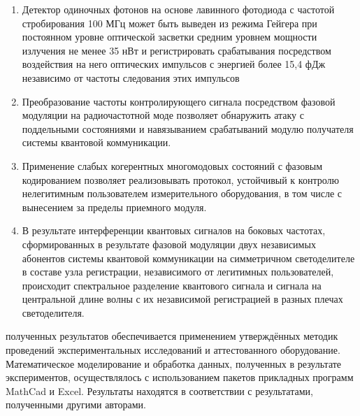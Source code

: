 {}
\begin{enumerate}

  \item Детектор одиночных фотонов на основе лавинного фотодиода с частотой стробирования 100 МГц  может быть выведен из режима Гейгера при постоянном уровне оптической засветки средним уровнем мощности излучения не менее 35 нВт и регистрировать срабатывания посредством воздействия на него оптических импульсов с энергией более 15,4 фДж независимо от частоты следования этих импульсов
  \item Преобразование частоты контролирующего сигнала посредством фазовой модуляции на радиочастотной моде позволяет обнаружить атаку с поддельными состояниями и навязыванием срабатываний модулю получателя системы квантовой коммуникации.
  \item Применение слабых когерентных многомодовых состояний с фазовым кодированием позволяет реализовывать протокол, устойчивый к контролю нелегитимным пользователем измерительного оборудования, в том числе с вынесением за пределы приемного модуля. 
  \item В результате интерференции квантовых сигналов на боковых частотах, сформированных в результате  фазовой модуляции двух независимых абонентов системы квантовой коммуникации на симметричном светоделителе в составе узла регистрации, независимого от легитимных пользователей, происходит спектральное разделение квантового сигнала и сигнала на центральной длине волны с их независимой регистрацией в разных плечах светоделителя. 
 
\end{enumerate}

{\reliability} полученных результатов обеспечивается применением утверждённых методик проведений экспериментальных исследований и аттестованного оборудование. Математическое моделирование и обработка данных, полученных в результате экспериментов, осуществлялось с использованием пакетов прикладных программ MathCad и Excel. Результаты находятся в соответствии с результатами, полученными другими авторами.


